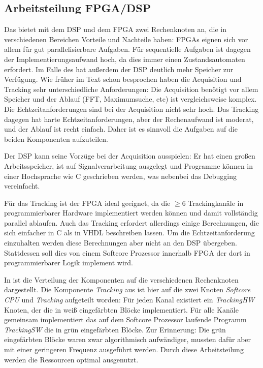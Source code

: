 \subsection{Arbeitsteilung FPGA/DSP}
Das \comboard bietet mit dem DSP und dem FPGA zwei Rechenknoten an, die in verschiedenen Bereichen Vorteile und Nachteile haben: FPGAs eignen sich vor allem für gut parallelisierbare Aufgaben. Für sequentielle Aufgaben ist dagegen der Implementierungsaufwand hoch, da dies immer einen Zustandsautomaten erfordert. Im Falle des \comboard hat außerdem der DSP deutlich mehr Speicher zur Verfügung. Wie früher im Text schon besprochen haben die Acquisition und Tracking sehr unterschiedliche Anforderungen: Die Acquisition benötigt vor allem Speicher und der Ablauf (FFT, Maximumsuche, etc) ist vergleichsweise komplex. Die Echtzeitanforderungen sind bei der Acquisition nicht sehr hoch. Das Tracking dagegen hat harte Echtzeitanforderungen, aber der Rechenaufwand ist moderat, und der Ablauf ist recht einfach. Daher ist es sinnvoll die Aufgaben auf die beiden Komponenten aufzuteilen.

Der DSP kann seine Vorzüge bei der Acquisition ausspielen: Er hat einen großen Arbeitsspeicher, ist auf Signalverarbeitung ausgelegt und Programme können in einer Hochsprache wie C geschrieben werden, was nebenbei das Debugging vereinfacht.

Für das Tracking ist der FPGA ideal geeignet, da die $\geq 6$ Trackingkanäle in programmierbarer Hardware implementiert werden können und damit vollständig parallel ablaufen. Auch das Tracking erfordert allerdings einige Berechnungen, die sich einfacher in C als in VHDL beschreiben lassen. Um die Echtzeitanforderung einzuhalten werden diese Berechnungen aber nicht an den DSP übergeben. Stattdessen soll dies von einem Softcore Prozessor innerhalb FPGA der dort in programmierbarer Logik implement wird.

In  ist die Verteilung der Komponenten auf die verschiedenen Rechenknoten dargestellt. Die Komponente \emph{Tracking} aus  ist hier auf die zwei Knoten \emph{Softcore CPU} und \emph{Tracking} aufgeteilt worden: Für jeden Kanal existiert ein \emph{TrackingHW} Knoten, der die in  weiß eingefärbten Blöcke implementiert. Für alle Kanäle gemeinsam implementiert das auf dem Softcore Prozessor laufende Programm \emph{TrackingSW} die in  grün eingefärbten Blöcke. Zur Erinnerung: Die grün eingefärbten Blöcke waren zwar algorithmisch aufwändiger, mussten dafür aber mit einer geringeren Frequenz ausgeführt werden. Durch diese Arbeitsteilung werden die Ressourcen optimal ausgenutzt.

